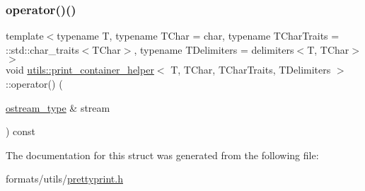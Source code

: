 \subsubsection{\texorpdfstring{operator()()}{operator()()}}
{\footnotesize\ttfamily template$<$typename T, typename T\+Char = char, typename T\+Char\+Traits = \+::std\+::char\+\_\+traits$<$\+T\+Char$>$, typename T\+Delimiters = delimiters$<$\+T, T\+Char$>$$>$ \\
void \mbox{\hyperlink{structutils_1_1print__container__helper}{utils\+::print\+\_\+container\+\_\+helper}}$<$ T, T\+Char, T\+Char\+Traits, T\+Delimiters $>$\+::operator() (\begin{DoxyParamCaption}\item[{\mbox{\hyperlink{structutils_1_1print__container__helper_a49abcd9f1eb893c1389687f0c7de5811}{ostream\+\_\+type}} \&}]{stream }\end{DoxyParamCaption}) const\hspace{0.3cm}{\ttfamily [inline]}}



The documentation for this struct was generated from the following file\+:\begin{DoxyCompactItemize}
\item 
formats/utils/\mbox{\hyperlink{prettyprint_8h}{prettyprint.\+h}}\end{DoxyCompactItemize}
